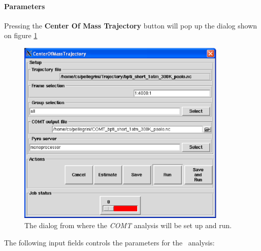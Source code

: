 \documentclass[a4paper,11pt]{report}
\begin{document}
\paragraph{Parameters\\}
\label{comt_parameters}
Pressing the \textbf{Center Of Mass Trajectory} button will pop up the dialog shown on figure \ref{fig:comt}
\begin{figure}[h!]
\begin{center}
\includegraphics[width=10cm]{Figures/comt.eps}
\end{center}
\caption[The \textit{COMT} analysis dialog]{The dialog from where the \textit{COMT} analysis will be set up and run.}
\label{fig:comt}
\end{figure}

The following input fields controls the parameters for the \COMT\ analysis:
\end{document}
